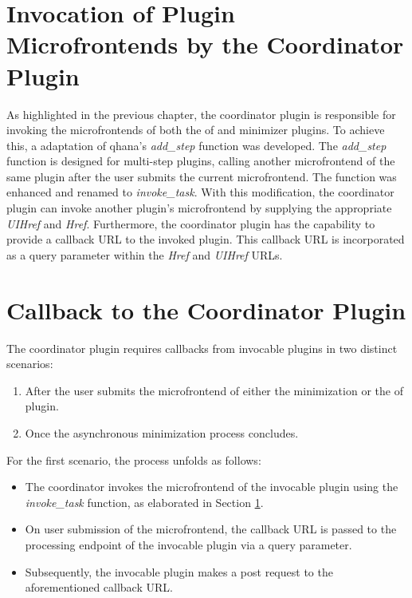 \documentclass[
  a4paper,  %
  twoside,  %
  bibliography=totoc,
  headsepline,
  cleardoublepage=empty,
  parskip=half,
  draft=false
]{scrbook}
\begin{document}



\section{Invocation of Plugin Microfrontends by the Coordinator Plugin}
\label{sec:invocationOfPluginMicrofrontendsByTheCoordinatorPlugin}

As highlighted in the previous chapter, the coordinator plugin is responsible for invoking the microfrontends of both the \gls{of} and minimizer plugins.
To achieve this, a adaptation of \gls{qhana}'s \emph{add\_step} function was developed.
The \emph{add\_step} function is designed for multi-step plugins, calling another microfrontend of the same plugin after the user submits the current microfrontend.
The function was enhanced and renamed to \emph{invoke\_task}.
With this modification, the coordinator plugin can invoke another plugin's microfrontend by supplying the appropriate \emph{UIHref} and \emph{Href}.
Furthermore, the coordinator plugin has the capability to provide a callback URL to the invoked plugin.
This callback URL is incorporated as a query parameter within the \emph{Href} and \emph{UIHref} URLs.

\section{Callback to the Coordinator Plugin}
\label{sec:implementationOfCallbacksToTheCoordinatorPlugin}

The coordinator plugin requires callbacks from invocable plugins in two distinct scenarios:
\begin{enumerate}
    \item After the user submits the microfrontend of either the minimization or the \gls{of} plugin.
    \item Once the asynchronous minimization process concludes.
\end{enumerate}

For the first scenario, the process unfolds as follows:
\begin{itemize}
    \item The coordinator invokes the microfrontend of the invocable plugin using the \emph{invoke\_task} function, as elaborated in Section \ref{sec:invocationOfPluginMicrofrontendsByTheCoordinatorPlugin}.
    \item On user submission of the microfrontend, the callback URL is passed to the processing endpoint of the invocable plugin via a query parameter.
    \item Subsequently, the invocable plugin makes a post request to the aforementioned callback URL.
\end{itemize}
\end{document}
